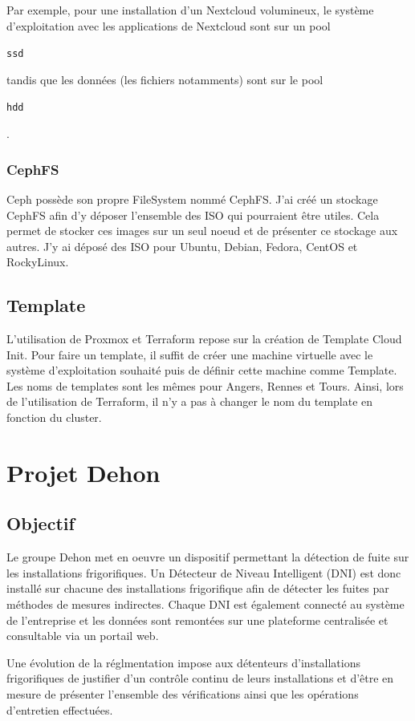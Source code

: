\documentclass[12pt, a4paper, twoside]{article}
\begin{document}
Par exemple, pour une installation d'un \gls{Nextcloud} volumineux, le système d'exploitation avec les applications de \gls{Nextcloud} sont sur un pool \begin{code}\texttt{ssd}\end{code} tandis que les données (les fichiers notamments) sont sur le pool \begin{code}\texttt{hdd}\end{code}.

\subsubsection{CephFS}
\gls{Ceph} possède son propre \gls{FileSystem} nommé CephFS.
J'ai créé un stockage CephFS afin d'y déposer l'ensemble des \gls{ISO} qui pourraient être utiles.
Cela permet de stocker ces images sur un seul noeud et de présenter ce stockage aux autres.
J'y ai déposé des \gls{ISO} pour Ubuntu, Debian, Fedora, CentOS et RockyLinux.

\subsection{Template}
L'utilisation de \gls{Proxmox} et \gls{Terraform} repose sur la création de Template Cloud Init.
Pour faire un template, il suffit de créer une machine virtuelle avec le système d'exploitation souhaité puis de définir cette machine comme Template.
Les noms de templates sont les mêmes pour Angers, Rennes et Tours.
Ainsi, lors de l'utilisation de Terraform, il n'y a pas à changer le nom du template en fonction du cluster.

\newpage
\section{Projet Dehon} \label{dehon}
\subsection{Objectif}
Le groupe Dehon met en oeuvre un dispositif permettant la détection de fuite sur les installations frigorifiques. 
Un Détecteur de Niveau Intelligent (\gls{DNI}) est donc installé sur chacune des installations frigorifique afin de détecter les fuites par méthodes de mesures indirectes.
Chaque DNI est également connecté au système de l'entreprise et les données sont remontées sur une plateforme centralisée et consultable via un portail web. 

Une évolution de la réglmentation impose aux détenteurs d'installations frigorifiques de justifier d'un contrôle continu de leurs installations et d'être en mesure de présenter l'ensemble des vérifications ainsi que les opérations d'entretien effectuées.
\end{document}
